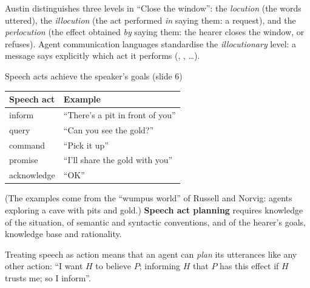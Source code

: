 \begin{nbintuition}
\notinslides
Austin distinguishes three levels in ``Close the window'': the \emph{locution} (the words
uttered), the \emph{illocution} (the act performed \emph{in} saying them: a request), and the
\emph{perlocution} (the effect obtained \emph{by} saying them: the hearer closes the window,
or refuses). Agent communication languages standardise the \emph{illocutionary} level: a
message says explicitly which act it performs (, , \ldots).
\end{nbintuition}

\begin{nbfact}{Speech acts achieve the speaker's goals (slide 6)}
\begin{center}
\small
\begin{tabular}{@{}ll@{}}
\toprule
\textbf{Speech act} & \textbf{Example} \\
\midrule
inform & ``There's a pit in front of you'' \\
query & ``Can you see the gold?'' \\
command & ``Pick it up'' \\
promise & ``I'll share the gold with you'' \\
acknowledge & ``OK'' \\
\bottomrule
\end{tabular}
\end{center}
(The examples come from the ``wumpus world'' of Russell and Norvig: agents exploring a cave
with pits and gold.) \textbf{Speech act planning} requires knowledge of the situation, of
semantic and syntactic conventions, and of the hearer's goals, knowledge base and
rationality.
\end{nbfact}

Treating speech as action means that an agent can \emph{plan} its utterances like any other
action: ``I want $H$ to believe $P$; informing $H$ that $P$ has this effect if $H$ trusts me;
so I inform''.

